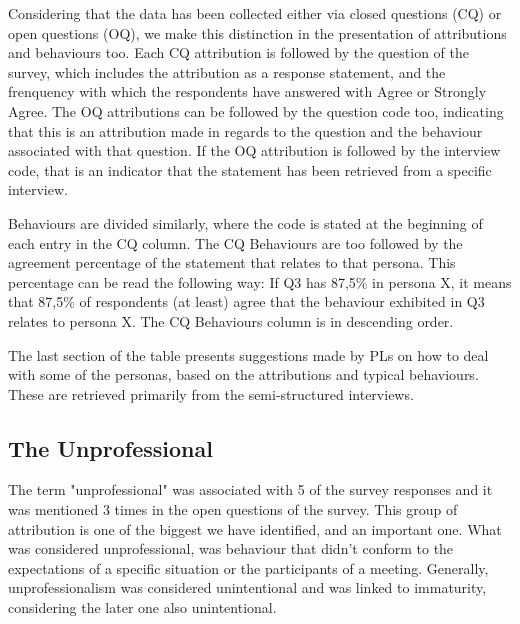 Considering that the data has been collected either via closed questions (CQ) or open questions (OQ), we make this distinction in the presentation of attributions and behaviours too. Each CQ attribution is followed by the question of the survey, which includes the attribution as a response statement, and the frenquency with which the respondents have answered with Agree or Strongly Agree. The OQ attributions can be followed by the question code too, indicating that this is an attribution made in regards to the question and the behaviour associated with that question. If the OQ attribution is followed by the interview code, that is an indicator that the statement has been retrieved from a specific interview. 

Behaviours are divided similarly, where the code is stated at the beginning of each entry in the CQ column. The CQ Behaviours are too followed by the agreement percentage of the statement that relates to that persona. This percentage can be read the following way: If Q3 has 87,5\% in persona X, it means that 87,5\% of respondents (at least) agree that the behaviour exhibited in Q3 relates to persona X. The CQ Behaviours column is in descending order. 

The last section of the table presents suggestions made by PLs on how to deal with some of the personas, based on the attributions and typical behaviours. These are retrieved primarily from the semi-structured interviews. 

\subsection{The Unprofessional}

The term "unprofessional" was associated with 5 of the survey responses and it was mentioned 3 times in the open questions of the survey. This group of attribution is one of the biggest we have identified, and an important one. What was considered unprofessional, was behaviour that didn't conform to the expectations of a specific situation or the participants of a meeting. Generally, unprofessionalism was considered unintentional and was linked to immaturity, considering the later one also unintentional. 

